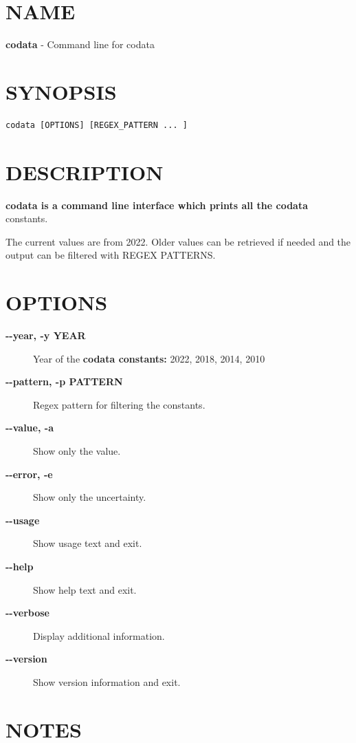 \section{NAME}

\textbf{codata }- Command line for codata

\section{SYNOPSIS}

\begin{verbatim}
codata [OPTIONS] [REGEX_PATTERN ... ]
\end{verbatim}

\section{DESCRIPTION}

\textbf{codata is a command line interface which prints all the codata}
constants.

The current values are from 2022. Older values can be retrieved if
needed and the output can be filtered with REGEX PATTERNS.

\section{OPTIONS}

\begin{description}
\item[\textbf{\textbf{-\/-year, -y YEAR}}]
Year of the \textbf{codata constants:} 2022, 2018, 2014, 2010
\item[\textbf{\textbf{-\/-pattern, -p PATTERN}}]
Regex pattern for filtering the constants.
\item[\textbf{\textbf{-\/-value, -a}}]
Show only the value.
\item[\textbf{\textbf{-\/-error, -e}}]
Show only the uncertainty.
\item[\textbf{\textbf{-\/-usage}}]
Show usage text and exit.
\item[\textbf{\textbf{-\/-help}}]
Show help text and exit.
\item[\textbf{\textbf{-\/-verbose}}]
Display additional information.
\item[\textbf{\textbf{-\/-version}}]
Show version information and exit.
\end{description}

\section{NOTES}

